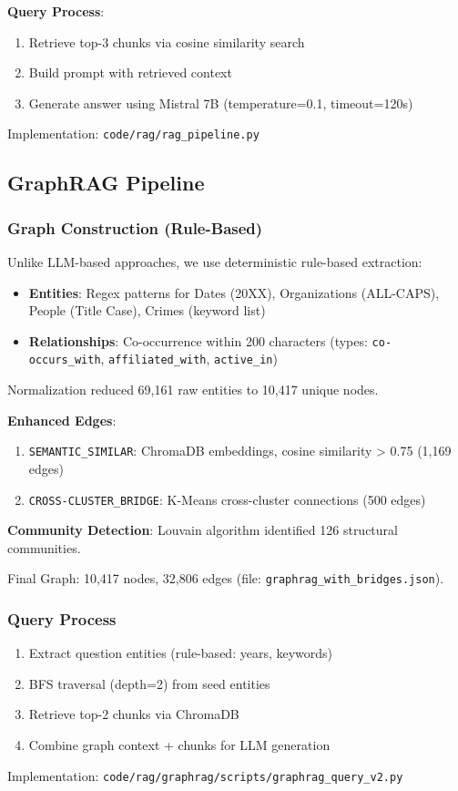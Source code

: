\documentclass[conference]{IEEEtran}
\begin{document}
\textbf{Query Process}:
\begin{enumerate}
\item Retrieve top-3 chunks via cosine similarity search
\item Build prompt with retrieved context
\item Generate answer using Mistral 7B (temperature=0.1, timeout=120s)
\end{enumerate}
Implementation: \texttt{code/rag/rag\_pipeline.py}

\subsection{GraphRAG Pipeline}
\subsubsection{Graph Construction (Rule-Based)}
Unlike LLM-based approaches, we use deterministic rule-based extraction:
\begin{itemize}
\item \textbf{Entities}: Regex patterns for Dates (20XX), Organizations (ALL-CAPS), People (Title Case), Crimes (keyword list)
\item \textbf{Relationships}: Co-occurrence within 200 characters (types: \texttt{co-occurs\_with}, \texttt{affiliated\_with}, \texttt{active\_in})
\end{itemize}
Normalization reduced 69,161 raw entities to 10,417 unique nodes.

\textbf{Enhanced Edges}:
\begin{enumerate}
\item \texttt{SEMANTIC\_SIMILAR}: ChromaDB embeddings, cosine similarity > 0.75 (1,169 edges)
\item \texttt{CROSS-CLUSTER\_BRIDGE}: K-Means cross-cluster connections (500 edges)
\end{enumerate}

\textbf{Community Detection}: Louvain algorithm identified 126 structural communities.

Final Graph: 10,417 nodes, 32,806 edges (file: \texttt{graphrag\_with\_bridges.json}).

\subsubsection{Query Process}
\begin{enumerate}
\item Extract question entities (rule-based: years, keywords)
\item BFS traversal (depth=2) from seed entities
\item Retrieve top-2 chunks via ChromaDB
\item Combine graph context + chunks for LLM generation
\end{enumerate}
Implementation: \texttt{code/rag/graphrag/scripts/graphrag\_query\_v2.py}
\end{document}
